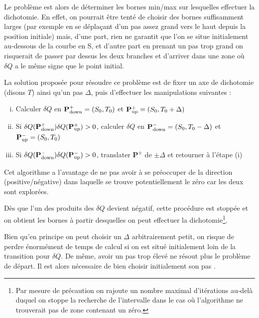 \documentclass[a4paper,12pt]{article}
\begin{document}
        
        Le problème est alors de déterminer les bornes min/max sur lesquelles effectuer la dichotomie. En effet, on pourrait être tenté de choisir des bornes suffisamment larges (par exemple en se déplaçant d'un pas assez grand vers le haut depuis la position initiale) mais, d'une part, rien ne garantit que l'on se situe initialement au-dessous de la courbe en S, et d'autre part en prenant un pas trop grand on risquerait de passer par dessus les deux branches et d'arriver dans une zone où $\delta Q $ a le même signe que le point initial.\newline
        
        La solution proposée pour résoudre ce problème est de fixer un axe de dichotomie (disons $T$) ainsi qu'un pas $\Delta$, puis d'effectuer les manipulations suivantes :
        \begin{enumerate}[(i)]
            \item Calculer $\delta Q$ en $\mathbf{P^+_{\rm{down}}} = (S_0 , T_0)$ et $\mathbf{P^+_{\rm{up}}} = (S_0 , T_0 + \Delta)$
            \item Si $\delta Q (\mathbf{P^+_{\rm{down}}}) \delta Q (\mathbf{P^+_{\rm{up}}}) > 0$, calculer $\delta Q$ en $\mathbf{P^-_{\rm{down}}} = (S_0 , T_0 - \Delta)$ et $\mathbf{P^-_{\rm{up}}} = (S_0 , T_0)$
            \item Si $\delta Q (\mathbf{P^-_{\rm{down}}}) \delta Q (\mathbf{P^-_{\rm{up}}}) > 0$, translater $\mathbf{P^{\pm}}$ de $\pm \Delta$ et retourner à l'étape (i)
        \end{enumerate}
        Cet algorithme a l'avantage de ne pas avoir à se préoccuper de la direction (positive/négative) dans laquelle se trouve potentiellement le zéro car les deux sont explorées.\newline
        
        Dès que l'un des produits des $\delta Q$ devient négatif, cette procédure est stoppée et on obtient les bornes à partir desquelles on peut effectuer la dichotomie\footnote{Par mesure de précaution on rajoute un nombre maximal d'itérations au-delà duquel on stoppe la recherche de l'intervalle dans le cas où l'algorithme ne trouverait pas de zone contenant un zéro.}. 
        
        Bien qu'en principe on peut choisir un $\Delta$ arbitrairement petit, on risque de perdre énormément de temps de calcul si on est situé initialement loin de la transition pour $\delta Q$. De même, avoir un pas trop élevé ne résout plus le problème de départ. Il est alors nécessaire de bien choisir initialement son pas .\newline
        
\end{document}

